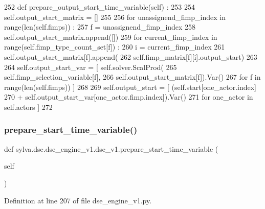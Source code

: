 \begin{DoxyCode}
252   \textcolor{keyword}{def }prepare\_output\_start\_time\_variable(self) :
253 
254     self.output\_start\_matrix = []
255 
256     \textcolor{keywordflow}{for} unassignend\_fimp\_index \textcolor{keywordflow}{in} range(len(self.fimps)) :
257       f = unassignend\_fimp\_index
258       self.output\_start\_matrix.append([])
259       \textcolor{keywordflow}{for} current\_fimp\_index \textcolor{keywordflow}{in} range(self.fimp\_type\_count\_set[f]) :
260         i = current\_fimp\_index
261         self.output\_start\_matrix[f].append(
262           self.fimp\_matrix[f][i].output\_start)
263 
264     self.output\_start\_var = [ self.solver.ScalProd(
265                              self.fimp\_selection\_variable[f],
266                              self.output\_start\_matrix[f]).Var()
267                       \textcolor{keywordflow}{for} f \textcolor{keywordflow}{in} range(len(self.fimps)) ]
268 
269     self.output\_start = [ (self.start[one\_actor.index]
270                          + self.output\_start\_var[one\_actor.fimp.index]).Var()
271                            \textcolor{keywordflow}{for} one\_actor \textcolor{keywordflow}{in} self.actors ]
272 
\end{DoxyCode}
\mbox{\label{classsylva_1_1dse_1_1dse__engine__v1_1_1dse__v1_a69426d904171c2df3b58efeb675f5eab}} 
\subsubsection{\texorpdfstring{prepare\+\_\+start\+\_\+time\+\_\+variable()}{prepare\_start\_time\_variable()}}
{\footnotesize\ttfamily def sylva.\+dse.\+dse\+\_\+engine\+\_\+v1.\+dse\+\_\+v1.\+prepare\+\_\+start\+\_\+time\+\_\+variable (\begin{DoxyParamCaption}\item[{}]{self }\end{DoxyParamCaption})}



Definition at line 207 of file dse\+\_\+engine\+\_\+v1.\+py.


